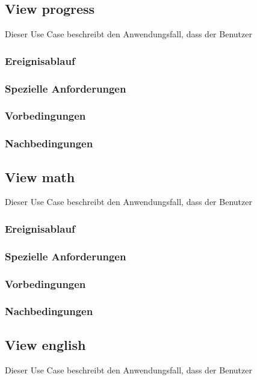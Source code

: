 	\subsection{View progress}
		Dieser Use Case beschreibt den Anwendungsfall, dass der Benutzer 
			
		\subsubsection{Ereignisablauf}
			
		\subsubsection{Spezielle Anforderungen}		
			
		\subsubsection{Vorbedingungen}
			
		\subsubsection{Nachbedingungen}
	
	\subsection{View math}
		Dieser Use Case beschreibt den Anwendungsfall, dass der Benutzer 
			
		\subsubsection{Ereignisablauf}
			
		\subsubsection{Spezielle Anforderungen}		
			
		\subsubsection{Vorbedingungen}
			
		\subsubsection{Nachbedingungen}
	
	\subsection{View english}
		Dieser Use Case beschreibt den Anwendungsfall, dass der Benutzer 
			
